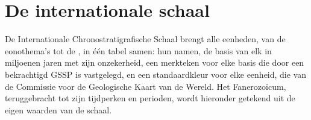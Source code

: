\section{De internationale schaal}\label{sec:b1:stratigraphic-scale:chart}

De Internationale Chronostratigrafische Schaal brengt alle eenheden, van de eonothema's tot de , in één tabel samen: hun namen, de basis van elk in miljoenen jaren met zijn onzekerheid, een merkteken voor elke basis die door een bekrachtigd GSSP is vastgelegd, en een standaardkleur voor elke eenheid, die van de Commissie voor de Geologische Kaart van de Wereld. Het Fanerozoïcum, teruggebracht tot zijn tijdperken en perioden, wordt hieronder getekend uit de eigen waarden van de schaal.

